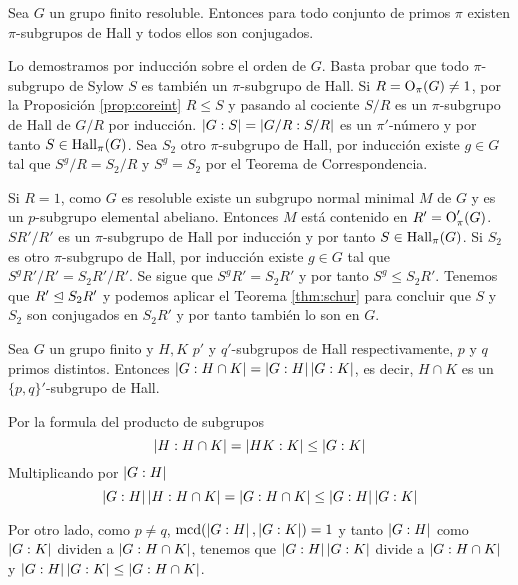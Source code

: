 \begin{teorema}[Hall]
	Sea $G$ un grupo finito resoluble. Entonces para todo conjunto de primos $\pi$ existen $\pi$-subgrupos de Hall y todos ellos son conjugados.
	\begin{demostracion}
		Lo demostramos por inducción sobre el orden de $G$. Basta probar que todo $\pi$-subgrupo de Sylow $S$ es también un $\pi$-subgrupo de Hall.
		Si $R = \operatorname{O}_\pi(G) \neq 1$, por la Proposición \ref{prop:coreint} $R \leq S$ y pasando al cociente $S/R$ es un $\pi$-subgrupo de Hall de $G/R$ por inducción. $\left|G:S\right| = \left|G/R:S/R\right|$ es un $\pi'$-número y por tanto $S \in \operatorname{Hall}_\pi(G)$. Sea $S_2$ otro $\pi$-subgrupo de Hall, por inducción existe $g\in G$ tal que $S^g/R = S_2/R$ y $S^g=S_2$ por el Teorema de Correspondencia.
		
		Si $R=1$, como $G$ es resoluble existe un subgrupo normal minimal $M$ de $G$ y es un $p$-subgrupo elemental abeliano. Entonces $M$ está contenido en $R' = \operatorname{O}_\pi'(G)$. $SR'/R'$ es un $\pi$-subgrupo de Hall por inducción y por tanto $S\in \operatorname{Hall}_\pi(G)$. Si $S_2$ es otro $\pi$-subgrupo de Hall, por inducción existe $g\in G$ tal que $S^gR'/R'=S_2R'/R'$. Se sigue que $S^gR' = S_2R'$ y por tanto $S^g \leq S_2R'$. Tenemos que $R'\trianglelefteq S_2R'$ y podemos aplicar el Teorema \ref{thm:schur} para concluir que $S$ y $S_2$ son conjugados en $S_2R'$ y por tanto también lo son en $G$.
	\end{demostracion}
\end{teorema}

\begin{lema}\label{lem:inthall} %
	Sea $G$ un grupo finito y $H, K$ $p'$ y $q'$-subgrupos de Hall respectivamente, $p$ y $q$ primos distintos. Entonces $\left|G:H\cap K\right| = \left|G:H\right|\left|G:K\right|$, es decir, $H\cap K$ es un $\{p,q\}'$-subgrupo de Hall.
	\begin{demostracion}
	 	Por la formula del producto de subgrupos
	 	\begin{equation*}
	 		\left|H:H\cap K\right| = \left|HK:K\right| \leq \left|G:K\right|
	 	\end{equation*}
	 	Multiplicando por $\left|G:H\right|$
	 	\begin{equation*}
	 		\left|G:H\right|\left|H:H\cap K\right| = \left|G:H\cap K\right| \leq \left|G:H\right|\left|G:K\right|
	 	\end{equation*}
	 	
	 	Por otro lado, como $p\neq q$, $\operatorname{mcd}(\left|G:H\right|,\left|G:K\right|) = 1$ y tanto $\left|G:H\right|$ como $\left|G:K\right|$ dividen a $\left|G:H\cap K\right|$, tenemos que $\left|G:H\right|\left|G:K\right|$ divide a $\left|G:H\cap K\right|$ y $\left|G:H\right|\left|G:K\right| \leq \left|G:H\cap K\right|$.
	\end{demostracion}
\end{lema}

